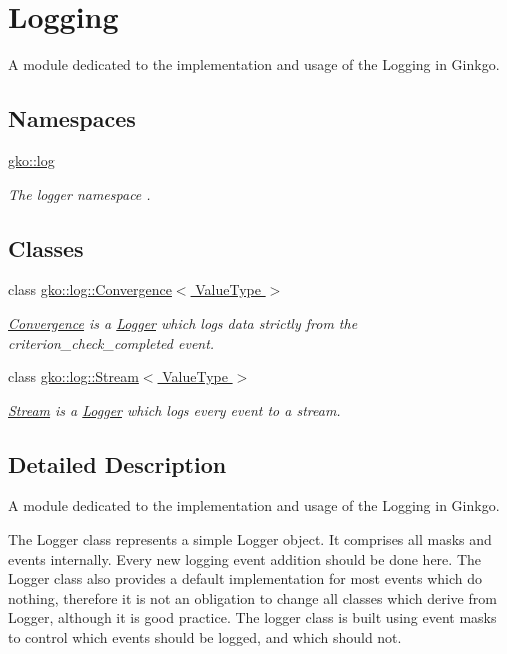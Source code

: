 \hypertarget{group__log}{}\section{Logging}
\label{group__log}


A module dedicated to the implementation and usage of the Logging in Ginkgo.  


\subsection*{Namespaces}
\begin{DoxyCompactItemize}
\item 
 \hyperlink{namespacegko_1_1log}{gko\+::log}
\begin{DoxyCompactList}\small\item\em The logger namespace . \end{DoxyCompactList}\end{DoxyCompactItemize}
\subsection*{Classes}
\begin{DoxyCompactItemize}
\item 
class \hyperlink{classgko_1_1log_1_1Convergence}{gko\+::log\+::\+Convergence$<$ Value\+Type $>$}
\begin{DoxyCompactList}\small\item\em \hyperlink{classgko_1_1log_1_1Convergence}{Convergence} is a \hyperlink{classgko_1_1log_1_1Logger}{Logger} which logs data strictly from the {\ttfamily criterion\+\_\+check\+\_\+completed} event. \end{DoxyCompactList}\item 
class \hyperlink{classgko_1_1log_1_1Stream}{gko\+::log\+::\+Stream$<$ Value\+Type $>$}
\begin{DoxyCompactList}\small\item\em \hyperlink{classgko_1_1log_1_1Stream}{Stream} is a \hyperlink{classgko_1_1log_1_1Logger}{Logger} which logs every event to a stream. \end{DoxyCompactList}\end{DoxyCompactItemize}


\subsection{Detailed Description}
A module dedicated to the implementation and usage of the Logging in Ginkgo. 

The Logger class represents a simple Logger object. It comprises all masks and events internally. Every new logging event addition should be done here. The Logger class also provides a default implementation for most events which do nothing, therefore it is not an obligation to change all classes which derive from Logger, although it is good practice. The logger class is built using event masks to control which events should be logged, and which should not. 